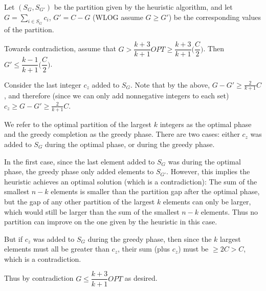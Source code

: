 \documentclass[letterpaper,12pt]{article}
\begin{document}

Let $(S_G,S_{G'})$ be the partition given by the heuristic algorithm, and let $G
= \sum_{i \in S_{G}} c_i$, $G' = C - G$ (WLOG assume $G \geq G'$) be the corresponding
values of the partition.

Towards contradiction, assume that $G > \dfrac{k+3}{k+1} OPT \geq \dfrac{k+3}{k+1}
\bigg( \dfrac{C}{2} \bigg)$. Then $G' \leq \dfrac{k-1}{k+1} \bigg( \dfrac{C}{2}
\bigg)$.

Consider the last integer $c_z$ added to $S_G$. Note that by the above, $G - G'
\geq \frac{2}{k+1} C$, and therefore (since we can only add nonnegative integers to
each set) $c_z \geq G - G' \geq \frac{2}{k+1} C$.

We refer to the optimal partition of the largest $k$ integers as the optimal
phase and the greedy completion as the greedy phase. There are two cases: either
$c_z$ was added to $S_G$ during the optimal phase, or during the greedy phase.

In the first case, since the last element added to $S_G$ was during the optimal
phase, the greedy phase only added elements to $S_{G'}$. However, this implies
the heuristic achieves an optimal solution (which is a contradiction): The sum
of the smallest $n - k$ elements is smaller than the partition gap after the
optimal phase, but the gap of any other partition of the largest $k$ elements
can only be larger, which would still be larger than the sum of the smallest $n
- k$ elements. Thus no partition can improve on the one given by the heuristic
in this case.

But if $c_z$ was added to $S_G$ during the greedy phase, then since the $k$
largest elements must all be greater than $c_z$, their sum (plus $c_z$) must be
$\ge 2 C > C$, which is a contradiction.

Thus by contradiction $G \leq \dfrac{k + 3}{k + 1} OPT$ as desired.




\pagebreak
\end{document}
